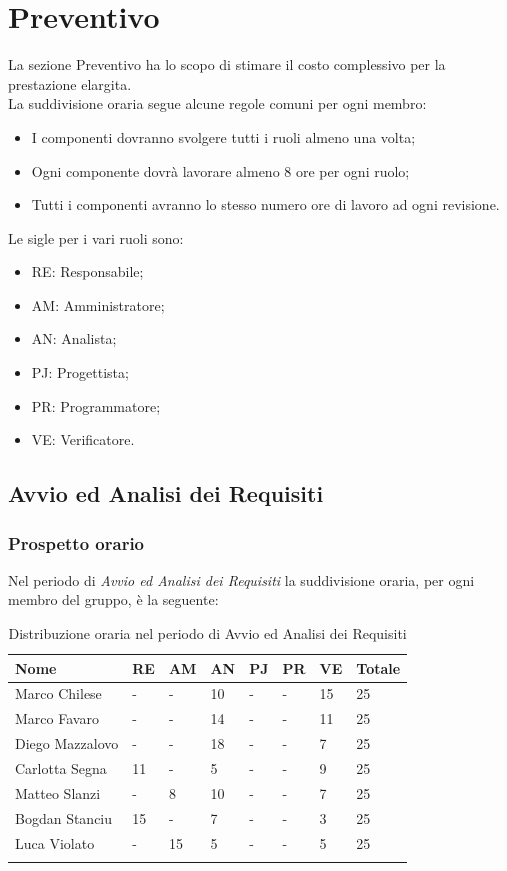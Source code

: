 \section{Preventivo}

La sezione Preventivo ha lo scopo di stimare il costo complessivo per la prestazione elargita. \\ 
La suddivisione oraria segue alcune regole comuni per ogni membro:
\begin{itemize}
	\item I componenti dovranno svolgere tutti i ruoli almeno una volta;
	\item Ogni componente dovrà lavorare almeno 8 ore per ogni ruolo;
	\item Tutti i componenti avranno lo stesso numero ore di lavoro ad ogni revisione.
\end{itemize}
Le sigle per i vari ruoli sono:
\begin{itemize}
	\item RE: Responsabile;
	\item AM: Amministratore;
	\item AN: Analista;
	\item PJ: Progettista;
	\item PR: Programmatore;
	\item VE: Verificatore.
\end{itemize}

\newpage
\subsection{Avvio ed Analisi dei Requisiti}
\subsubsection{Prospetto orario}

Nel periodo di \textit{Avvio ed Analisi dei Requisiti} la suddivisione oraria, per ogni membro del gruppo, è la seguente:

\begin{longtable}{|C{.30\textwidth}|C{.06\textwidth}|C{.06\textwidth}|C{.06\textwidth} | C{.06\textwidth}| C{.06\textwidth} | C{.06\textwidth} | C{.10\textwidth} |}
\hline
\textbf{Nome} & \textbf{RE} & \textbf{AM} & \textbf{AN} & \textbf{PJ} & \textbf{PR} & \textbf{VE} & \textbf{Totale}\\
\hline 
Marco Chilese & - & - & 10 & - & - & 15 & 25 \\
\hline
Marco Favaro & - & - & 14 & - & - & 11 & 25 \\
\hline
Diego Mazzalovo & - & - & 18 & - & - & 7 & 25 \\
\hline
Carlotta Segna & 11 & - & 5 & - & - & 9 & 25 \\
\hline
Matteo Slanzi & - & 8 & 10 & - & - & 7 & 25 \\
\hline
Bogdan Stanciu & 15 & - & 7 & - & - & 3 & 25\\
\hline
Luca Violato & - & 15 & 5 & - & - & 5 & 25 \\
\hline


\caption{Distribuzione oraria nel periodo di Avvio ed Analisi dei Requisiti}
\label{tab:dist oraria aar}
\end{longtable}

